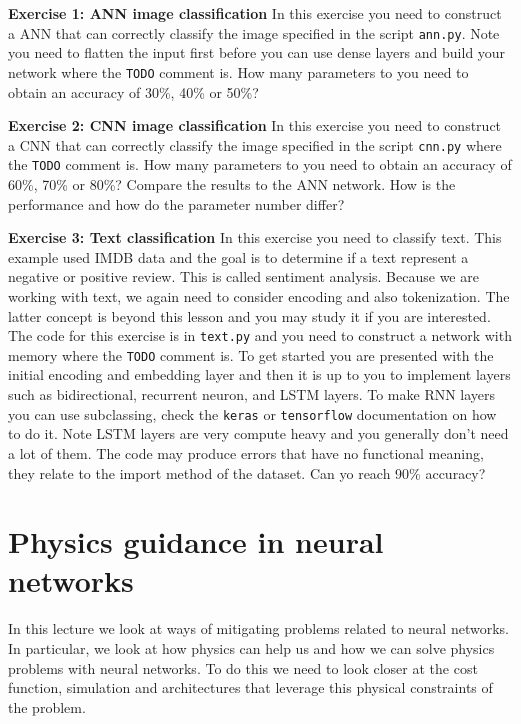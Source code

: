 \documentclass[12pt,a4paper]{article} %
\numberwithin{equation}{section}
\begin{document}
		\textbf{Exercise 1: ANN image classification}\newline
		In this exercise you need to construct a ANN that can correctly classify the image specified in the script \texttt{ann.py}. Note you need to flatten the input first before you can use dense layers and build your network where the \texttt{TODO} comment is. How many parameters to you need to obtain an accuracy of 30\%, 40\% or 50\%?\newline
		
		\textbf{Exercise 2: CNN image classification}\newline
		In this exercise you need to construct a CNN that can correctly classify the image specified in the script \texttt{cnn.py} where the \texttt{TODO} comment is. How many parameters to you need to obtain an accuracy of 60\%, 70\% or 80\%? Compare the results to the ANN network. How is the performance and how do the parameter number differ? \newline
		
		\textbf{Exercise 3: Text classification}\newline
		In this exercise you need to classify text. This example used IMDB data and the goal is to determine if a text represent a negative or positive review. This is called sentiment analysis. Because we are working with text, we again need to consider encoding and also tokenization. The latter concept is beyond this lesson and you may study it if you are interested. The code for this exercise is in \texttt{text.py} and you need to construct a network with memory where the \texttt{TODO} comment is. To get started you are presented with the initial encoding and embedding layer and then it is up to you to implement layers such as bidirectional, recurrent neuron, and LSTM layers. To make RNN layers you can use subclassing, check the \texttt{keras} or \texttt{tensorflow} documentation on how to do it. Note LSTM layers are very compute heavy and you generally don't need a lot of them. The code may produce errors that have no functional meaning, they relate to the import method of the dataset. Can yo reach 90\% accuracy?
		
\section{Physics guidance in neural networks}
	In this lecture we look at ways of mitigating problems related to neural networks. In particular, we look at how physics can help us and how we can solve physics problems with neural networks. To do this we need to look closer at the cost function, simulation and architectures that leverage this physical constraints of the problem.
	
\end{document}
